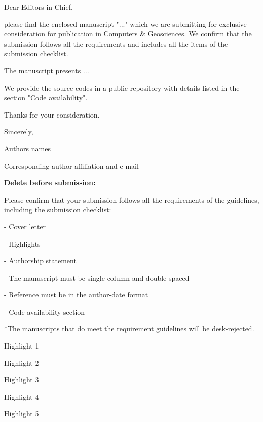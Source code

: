 \documentclass[a4paper,fleqn]{cas-sc}
\begin{document}
\begin{coverletter}

Dear Editors-in-Chief,
\newline
 
please find the enclosed manuscript "..." which we are submitting for exclusive consideration for publication in Computers \& Geosciences. We confirm that the submission follows all the requirements and includes all the items of the submission checklist.  
\newline
 
The manuscript presents ... 
\newline

We provide the source codes in a public repository with details listed in the section "Code availability".
\newline

Thanks for your consideration. 
\newline

Sincerely,
\newline

Authors names

Corresponding author affiliation and e-mail
\newline

\textbf{Delete before submission:}

Please confirm that your submission follows all the requirements of the guidelines, including the submission checklist:

- Cover letter

- Highlights

- Authorship statement

- The manuscript must be single column and double spaced

- Reference must be in the author-date format

- Code availability section 

*The manuscripts that do meet the requirement guidelines will be desk-rejected.



\end{coverletter}

 
\begin{highlights}
\item Highlight 1
\item Highlight 2
\item Highlight 3
\item Highlight 4
\item Highlight 5
\end{highlights}
\end{document}
